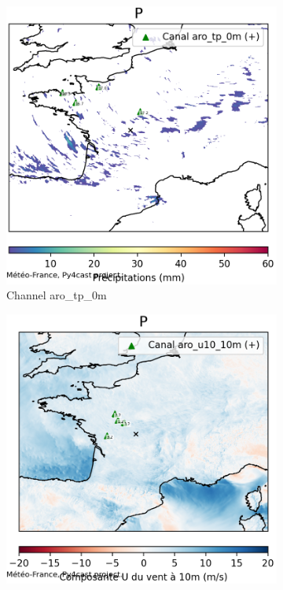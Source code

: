 \begin{figure}[h]
    \centering
    \begin{subfigure}[b]{0.49\textwidth}
        \includegraphics[width=\textwidth]{Images/titan_rain_anchors/nov-21/2023112100_feature_aro_tp_0m.png}
        \caption{Channel aro\_tp\_0m}
    \end{subfigure}
    \hfill
    \begin{subfigure}[b]{0.49\textwidth}
        \includegraphics[width=\textwidth]{Images/titan_rain_anchors/nov-21/2023112100_feature_aro_u10_10m.png}

\end{subfigure}
\end{figure}
